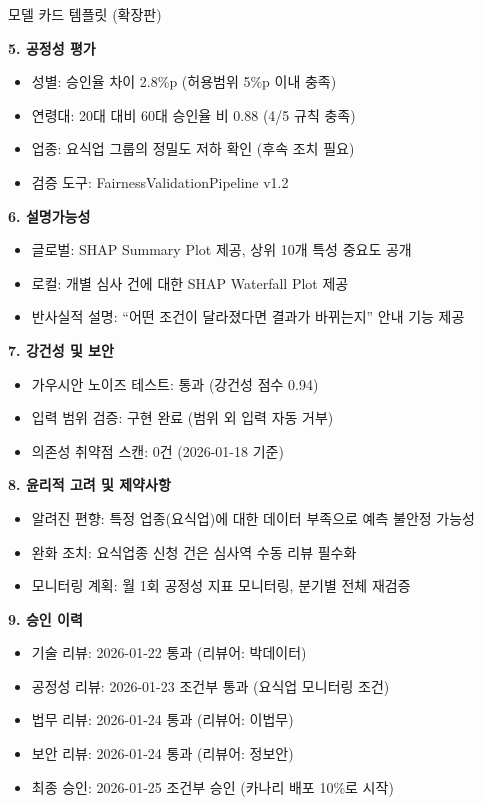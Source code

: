 \begin{practicaltool}{모델 카드 템플릿 (확장판)}
\begin{tcolorbox}[colback=white, colframe=black!75!white, title=Model Card for {[모델명]}]
\textbf{5. 공정성 평가}
\begin{itemize}
  \item 성별: 승인율 차이 2.8\%p (허용범위 5\%p 이내 충족)
  \item 연령대: 20대 대비 60대 승인율 비 0.88 (4/5 규칙 충족)
  \item 업종: 요식업 그룹의 정밀도 저하 확인 (후속 조치 필요)
  \item 검증 도구: FairnessValidationPipeline v1.2
\end{itemize}

\textbf{6. 설명가능성}
\begin{itemize}
  \item 글로벌: SHAP Summary Plot 제공, 상위 10개 특성 중요도 공개
  \item 로컬: 개별 심사 건에 대한 SHAP Waterfall Plot 제공
  \item 반사실적 설명: ``어떤 조건이 달라졌다면 결과가 바뀌는지'' 안내 기능 제공
\end{itemize}

\textbf{7. 강건성 및 보안}
\begin{itemize}
  \item 가우시안 노이즈 테스트: 통과 (강건성 점수 0.94)
  \item 입력 범위 검증: 구현 완료 (범위 외 입력 자동 거부)
  \item 의존성 취약점 스캔: 0건 (2026-01-18 기준)
\end{itemize}

\textbf{8. 윤리적 고려 및 제약사항}
\begin{itemize}
  \item 알려진 편향: 특정 업종(요식업)에 대한 데이터 부족으로 예측 불안정 가능성
  \item 완화 조치: 요식업종 신청 건은 심사역 수동 리뷰 필수화
  \item 모니터링 계획: 월 1회 공정성 지표 모니터링, 분기별 전체 재검증
\end{itemize}

\textbf{9. 승인 이력}
\begin{itemize}
  \item 기술 리뷰: 2026-01-22 통과 (리뷰어: 박데이터)
  \item 공정성 리뷰: 2026-01-23 조건부 통과 (요식업 모니터링 조건)
  \item 법무 리뷰: 2026-01-24 통과 (리뷰어: 이법무)
  \item 보안 리뷰: 2026-01-24 통과 (리뷰어: 정보안)
  \item 최종 승인: 2026-01-25 조건부 승인 (카나리 배포 10\%로 시작)
\end{itemize}
\end{tcolorbox}
\end{practicaltool}

